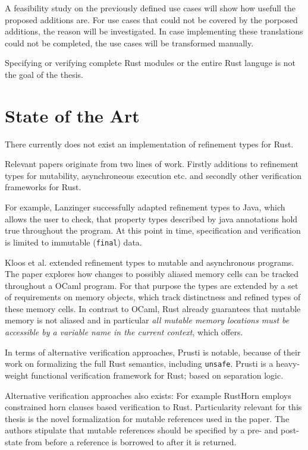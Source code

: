 \documentclass[11pt]{article}
\begin{document}
A feasibility study on the previously defined use cases will show how usefull the proposed additions are. For use cases that could not be covered by the porposed additions, the reason will be investigated.
In case implementing these translations could not be completed, the use cases will be transformed manually.

Specifying or verifying complete Rust modules or the entire Rust languge is not the goal of the thesis.

\section{State of the Art}

There currently does not exist an implementation of refinement types for Rust.

Relevant papers originate from two lines of work. Firstly additions to refinement types for mutability, asynchroneous execution etc. and secondly other verification frameworks for Rust.

For example, Lanzinger \cite{lanzinger_property_2021} successfully adapted refinement types to Java, which allows the user to check, that property types described by java annotations hold true throughout the program. At this point in time, specification and verification is limited to immutable (\texttt{final}) data.

Kloos et al. \cite{kloos_asynchronous_2015} extended refinement types to mutable and asynchronous programs. The paper explores how changes to possibly aliased memory cells can be tracked throughout a OCaml program. For that purpose the types are extended by a set of requirements on memory objects, which track distinctness and refined types of these memory cells. In contrast to OCaml, Rust already guarantees that mutable memory is not aliased and in particular \textit{all mutable memory locations must be accessible by a variable name in the current context}, which offers.

In terms of alternative verification approaches, Prusti\cite{astrauskas_leveraging_2019} is notable, because of their work on formalizing the full Rust semantics, including \texttt{unsafe}. Prusti is a heavy-weight functional verification framework for Rust; based on separation logic.

Alternative verification approaches also exists: For example RustHorn\cite{matsushita_rusthorn_2020} employs constrained horn clauses based verification to Rust. Particularity relevant for this thesis is the novel formalization for mutable references used in the paper. The authors stipulate that mutable references should be specified by a pre- and post-state from before a reference is borrowed to after it is returned.
\end{document}

